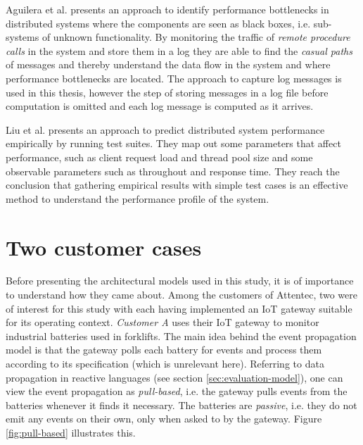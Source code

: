 Aguilera et al. \cite{aguilera2003performance} presents an approach to identify
performance bottlenecks in distributed systems where the components are seen as
black boxes, i.e. sub-systems of unknown functionality. By monitoring the
traffic of \textit{remote procedure calls} in the system and store them in a
log they are able to find the \textit{casual paths} of messages and thereby
understand the data flow in the system and where performance bottlenecks are
located. The approach to capture log messages is used in this thesis, however
the step of storing messages in a log file before computation is omitted and
each log message is computed as it arrives.

Liu et al. \cite{liu2002designing} presents an approach to predict distributed
system performance empirically by running test suites. They map out some
parameters that affect performance, such as client request load and thread pool
size and some observable parameters such as throughout and response time. They
reach the conclusion that gathering empirical results with simple test cases is
an effective method to understand the performance profile of the system.

\section{Two customer cases}
\label{sec:customer-cases}

Before presenting the architectural models used in this study, it is of
importance to understand how they came about. Among the customers of Attentec,
two were of interest for this study with each having implemented an IoT gateway
suitable for its operating context. \textit{Customer A} uses their IoT gateway
to monitor industrial batteries used in forklifts. The main idea behind the
event propagation model is that the gateway polls each battery for events and
process them according to its specification (which is unrelevant here).
Referring to data propagation in reactive languages (see section
\ref{sec:evaluation-model}), one can view the event propagation as
\textit{pull-based}, i.e. the gateway pulls events from the batteries whenever
it finds it necessary. The batteries are \textit{passive}, i.e. they do not
emit any events on their own, only when asked to by the gateway. Figure
\ref{fig:pull-based} illustrates this.

